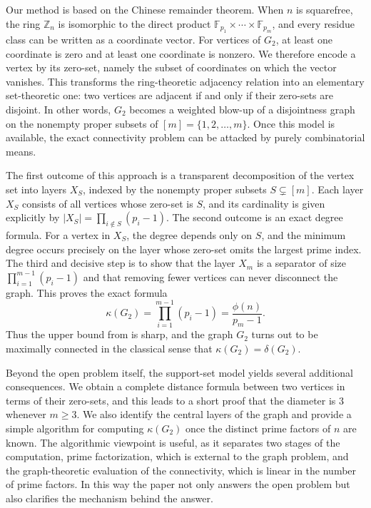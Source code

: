 \documentclass[12pt]{article}
\theoremstyle{definition}
\newcommand{\F}{\mathbb F}
\begin{document}
	Our method is based on the Chinese remainder theorem. When $n$ is squarefree, the ring $\mathbb Z_n$ is isomorphic to the direct product $\F_{p_1}\times\cdots\times \F_{p_m}$, and every residue class can be written as a coordinate vector. For vertices of $G_2$, at least one coordinate is zero and at least one coordinate is nonzero. We therefore encode a vertex by its zero-set, namely the subset of coordinates on which the vector vanishes. This transforms the ring-theoretic adjacency relation into an elementary set-theoretic one: two vertices are adjacent if and only if their zero-sets are disjoint. In other words, $G_2$ becomes a weighted blow-up of a disjointness graph on the nonempty proper subsets of $[m]=\{1,2,\dots,m\}$. Once this model is available, the exact connectivity problem can be attacked by purely combinatorial means. 
	
	The first outcome of this approach is a transparent decomposition of the vertex set into layers $X_S$, indexed by the nonempty proper subsets $S\subsetneq [m]$. Each layer $X_S$ consists of all vertices whose zero-set is $S$, and its cardinality is given explicitly by
	$ |X_S|=\prod_{i\notin S}(p_i-1). $
	The second outcome is an exact degree formula. For a vertex in $X_S$, the degree depends only on $S$, and the minimum degree occurs precisely on the layer whose zero-set omits the largest prime index. The third and decisive step is to show that the layer $X_{{m}}$ is a separator of size $\prod_{i=1}^{m-1}(p_i-1)$ and that removing fewer vertices can never disconnect the graph. This proves the exact formula
	$$
	\kappa(G_2)=\prod_{i=1}^{m-1}(p_i-1)=\frac{\phi(n)}{p_m-1}.
	$$
	Thus the upper bound from \cite{Banerjee2022} is sharp, and the graph $G_2$ turns out to be maximally connected in the classical sense that $\kappa(G_2)=\delta(G_2)$.
	
	Beyond the open problem itself, the support-set model yields several additional consequences. We obtain a complete distance formula between two vertices in terms of their zero-sets, and this leads to a short proof that the diameter is $3$ whenever $m\geq 3$. We also identify the central layers of the graph and provide a simple algorithm for computing $\kappa(G_2)$ once the distinct prime factors of $n$ are known. The algorithmic viewpoint is useful, as it separates two stages of the computation, prime factorization, which is external to the graph problem, and the graph-theoretic evaluation of the connectivity, which is linear in the number of prime factors. In this way the paper not only answers the open problem but also clarifies the mechanism behind the answer.
	
\end{document}
